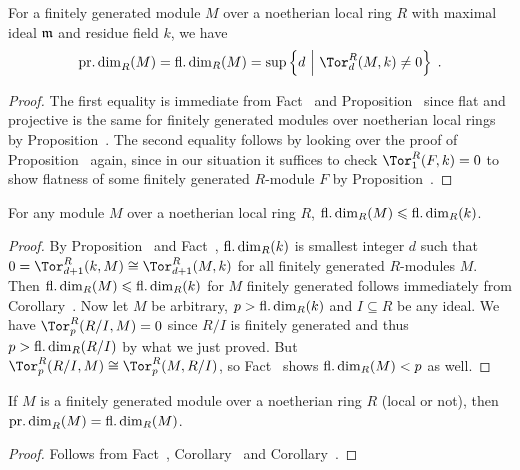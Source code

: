 \documentclass[a4paper,parskip=half,numbers=enddot, DIV=12]{scrreprt}
\renewcommand{\leq}{\leqslant}
\begin{document}
\begin{cor}
	For a finitely generated module $M$ over a noetherian local ring $R$ with maximal ideal $\mathfrak{m}$ and residue field $k$, we have
	\begin{align*}
		\pdim_R(M)=\fdim_R(M)=\sup\left\{d\st \Tor_d^R(M,k)\neq 0\right\}\;.
	\end{align*}
\end{cor}
\begin{proof}
	The first equality is immediate from Fact~ and Proposition~ since flat and projective is the same for finitely generated modules over noetherian local rings by Proposition~. The second equality follows by looking over the proof of Proposition~ again, since in our situation it suffices to check $\Tor_1^R(F,k)=0$ to show flatness of some finitely generated $R$-module $F$ by Proposition~.
\end{proof}
\begin{cor}
	For any module $M$ over a noetherian local ring $R$, $\fdim_R(M)\leq \fdim_R(k)$.
\end{cor}
\begin{proof}
	By Proposition~ and Fact~, $\operatorname{fl.dim}_R(k)$ is smallest integer $d$ such that $0=\Tor_{d+1}^R(k,M)\cong \Tor_{d+1}^R(M,k)$ for all finitely generated $R$-modules $M$. Then $\fdim_R(M)\leq \fdim_R(k)$ for $M$ finitely generated follows immediately from Corollary~. Now let $M$ be arbitrary, $p>\operatorname{fl.dim}_R(k)$ and $I\subseteq R$ be any ideal. We have $\Tor_p^R(R/I,M)=0$ since $R/I$ is finitely generated and thus $p>\operatorname{fl.dim}_R(R/I)$ by what we just proved. But $\Tor_p^R(R/I,M)\cong\Tor_p^R(M,R/I)$, so Fact~ shows $\operatorname{fl.dim}_R(M)<p$ as well.
\end{proof}
\begin{cor}
	If $M$ is a finitely generated module over a noetherian ring $R$ (local or not), then $\operatorname{pr.dim}_R(M)=\operatorname{fl.dim}_R(M)$.
\end{cor}
\begin{proof}
	Follows from Fact~, Corollary~ and Corollary~.
\end{proof}
\end{document}
